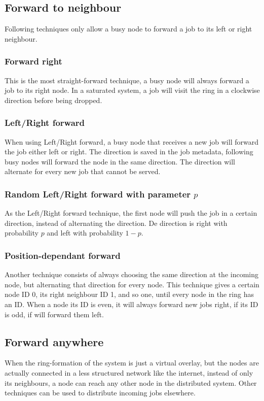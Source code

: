 \documentclass[10pt,a4paper,titlepage]{article}
\begin{document}
\subsection{Forward to neighbour}
Following techniques only allow a busy node to forward a job to its left or right neighbour.

\subsubsection{Forward right}
This is the most straight-forward technique, a busy node will always forward a job to its right node. In a saturated system, a job will visit the ring in a clockwise direction before being dropped.

\subsubsection{Left/Right forward}
When using Left/Right forward, a busy node that receives a new job will forward the job either left or right. The direction is saved in the job metadata, following busy nodes will forward the node in the same direction. The direction will alternate for every new job that cannot be served.

\subsubsection{Random Left/Right forward with parameter $p$}
As the Left/Right forward technique, the first node will push the job in a certain direction, instead of alternating the direction. De direction is right with probability $p$ and left with probability $1-p$.

\subsubsection{Position-dependant forward}
Another technique consists of always choosing the same direction at the incoming node, but alternating that direction for every node. This technique gives a certain node ID 0, its right neighbour ID 1, and so one, until every node in the ring has an ID. When a node its ID is even, it will always forward new jobs right, if its ID is odd, if will forward them left.

\subsection{Forward anywhere}
When the ring-formation of the system is just a virtual overlay, but the nodes are actually connected in a less structured network like the internet, instead of only its neighbours, a node can reach any other node in the distributed system. Other techniques can be used to distribute incoming jobs elsewhere.
\end{document}
